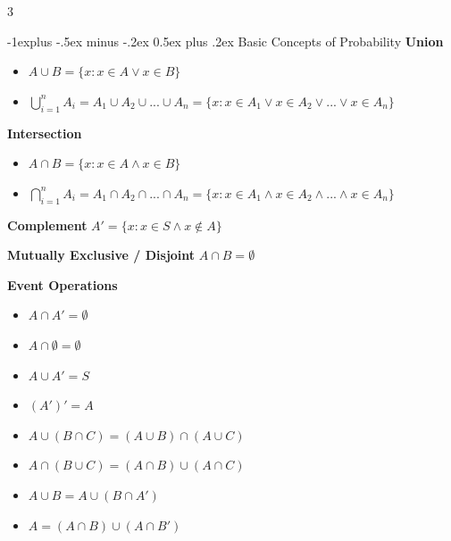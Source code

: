 \documentclass[10pt, landscape]{article}
\makeatletter
\renewcommand{\section}{\@startsection{section}{1}{0mm}%
                                {-1ex plus -.5ex minus -.2ex}%
                                {0.5ex plus .2ex}%
                                {\normalfont\large\bfseries}}
\renewcommand{\section}{\@startsection{section}{2}{0mm}%
                                {-1explus -.5ex minus -.2ex}%
                                {0.5ex plus .2ex}%
                                {\normalfont\normalsize\bfseries}}
\makeatother
\begin{document}
\raggedright
\footnotesize
\begin{multicols*}{3}

\setlength{\columnseprule}{0.25pt}
\setlength{\premulticols}{1pt}
\setlength{\postmulticols}{1pt}
\setlength{\multicolsep}{1pt}
\setlength{\columnsep}{2pt}

\begin{center}
\end{center}

\section{Basic Concepts of Probability}
\textbf{Union}
\begin{itemize}
    \item $A \cup B = \{x:x\in A \lor x \in B\}$
    \item $\bigcup_{i=1}^n A_i=A_1\cup A_2 \cup ... \cup A_n=\{x:x\in A_1 \lor x\in A_2 \lor ... \lor x \in A_n\}$
\end{itemize}

\textbf{Intersection}
\begin{itemize}
    \item $A \cap B = \{x:x\in A \land x \in B\}$
    \item $\bigcap_{i=1}^n A_i=A_1\cap A_2 \cap ... \cap A_n=\{x:x\in A_1 \land x\in A_2 \land ... \land x \in A_n\}$
\end{itemize}

\textbf{Complement} $A'=\{x : x\in S \land x \notin A\}$

\textbf{Mutually Exclusive / Disjoint} $A \cap B = \emptyset$

\textbf{Event Operations}
\begin{itemize}
    \item $A \cap A' = \emptyset$
    \item $A \cap \emptyset = \emptyset$
    \item $A \cup A' = S$
    \item $(A')'=A$
    \item $A \cup (B \cap C) = (A \cup B) \cap (A \cup C)$
    \item $A \cap (B \cup C)=(A\cap B) \cup (A \cap C)$
    \item $A \cup B = A\cup (B \cap A')$
    \item $A = (A \cap B) \cup (A \cap B')$
\end{itemize}


\end{multicols*}
\end{document}

